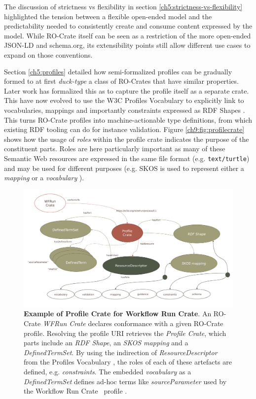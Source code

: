 The discussion of strictness vs flexibility in section \vref{ch5:strictness-vs-flexibility} highlighted the tension between a flexible open-ended model and the predictability needed to consistently create and consume content expressed by the model.
While RO-Crate itself can be seen as a restriction of the more open-ended JSON-LD and schema.org, its extensibility points still allow different use cases to expand on those conventions.  

Section \vref{ch5:profiles} detailed how semi-formalized profiles can be gradually formed to at first \emph{duck-type} a class of RO-Crates that have similar properties.
Later work has formalized this as  to capture the profile itself as a separate crate. This have now evolved to use the W3C Profiles Vocabulary \cite{dx-prof} to explicitly link to vocabularies, mappings and importantly constraints expressed as RDF Shapes \cite{fdo-collections}. 
This turns RO-Crate profiles into machine-actionable type definitions, from which existing RDF tooling can do for instance validation. 
Figure \vref{ch9:fig:profilecrate} shows how the usage of \emph{roles} within the profile crate indicates the purpose of the constituent parts.
Roles are here particularly important as many of these Semantic Web resources are expressed in the same file format (e.g. \texttt{text/turtle}) and may be used for different purposes (e.g.
SKOS is used to represent either a \emph{mapping} or a \emph{vocabulary} \cite{w3-skos-primer}).

\begin{figure}[htb]
    \includegraphics[width=\textwidth]{figures/ch09/profile-crate.pdf}
      \caption[Example of Profile Crate]{\textbf{Example of Profile Crate for Workflow Run Crate}. 
      An RO-Crate \emph{WFRun Crate} declares conformance with a given RO-Crate profile. 
      Resolving the profile URI retrieves the \emph{Profile Crate}, which parts include an \emph{RDF Shape}, an \emph{SKOS mapping} and a \emph{DefinedTermSet}. 
      By using the indirection of \emph{ResourceDescriptor} from the Profiles Vocabulary \cite{dx-prof}, the roles of each of these artefacts are defined, e.g. \emph{constraints}. 
      The embedded \emph{vocabulary} as a \emph{DefinedTermSet} defines ad-hoc terms like \emph{sourceParameter} used by the Workflow Run Crate\footnotemark~ profile \cite{workflow-run-crate}.
      }
    \label{ch9:fig:profilecrate}
  \end{figure}

